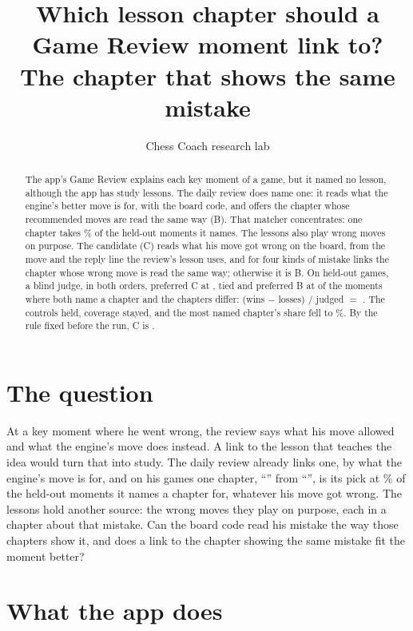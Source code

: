 \documentclass[11pt]{article}
\title{Which lesson chapter should a Game Review moment link to?\\[0.3em]
\large The chapter that shows the same mistake}
\author{Chess Coach research lab}
\date{}
\begin{document}
\maketitle

\begin{abstract}
The app's Game Review explains each key moment of a game, but it named no lesson, although the
app has \Lessons{} study lessons. The daily review does name one: it reads what the engine's
better move is for, with the board code, and offers the chapter whose recommended moves are read
the same way (B). That matcher concentrates: one chapter takes \HeldBTop\% of the held-out moments
it names. The lessons also play \WrongMoves{} wrong moves on purpose. The candidate (C) reads what
his move got wrong on the board, from the move and the reply line the review's lesson uses, and
for four kinds of mistake links the chapter whose wrong move is read the same way; otherwise it is
B. On \HeldGames{} held-out games, a blind judge, in both orders, preferred C at \HeldWins, tied
\HeldTies{} and preferred B at \HeldLosses{} of the \HeldJudged{} moments where both name a
chapter and the chapters differ: (wins $-$ losses) / judged $=$ \HeldNet. The controls held, coverage stayed,
and the most named chapter's share fell to \HeldCTop\%. By the rule fixed before the run, C is
\Kept.
\end{abstract}

\section{The question}

At a key moment where he went wrong, the review says what his move allowed and what the
engine's move does instead. A link to the lesson that teaches the idea would turn that into
study. The daily review already links one, by what the engine's move is for, and on his games
one chapter, ``\TopTitle'' from ``\TopLesson'', is its pick at \HeldBTop\% of the held-out
moments it names a chapter for, whatever his move got wrong. The lessons hold another source: the wrong moves they play on purpose,
each in a chapter about that mistake. Can the board code read his mistake the way those chapters
show it, and does a link to the chapter showing the same mistake fit the moment better?

\section{What the app does}
\end{document}
